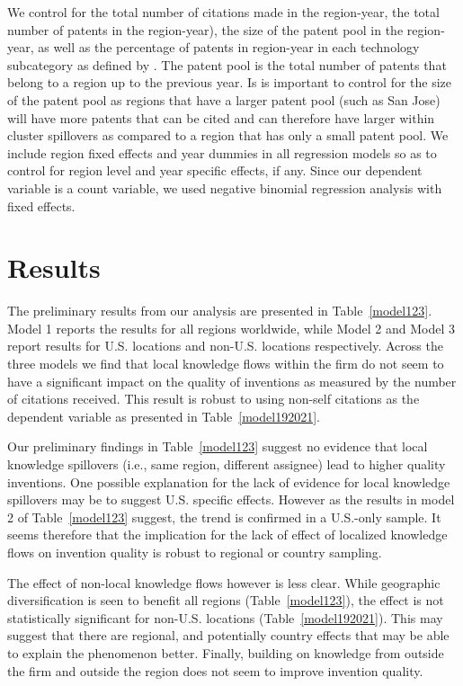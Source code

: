\documentclass[parskip=full,10pt,letterpaper]{article}
\begin{document}
We control for the total number of citations made in the region-year, the total number of patents in the region-year), the size of the patent pool in the region-year, as well as the percentage of patents in region-year in each technology subcategory as defined by \cite{Hall2001}. The patent pool is the total number of patents that belong to a region up to the previous year. Is is important to control for the size of the patent pool as  regions that have a larger patent pool (such as San Jose) will have more patents that can be cited and can therefore have larger within cluster spillovers as compared to a region that has only a small patent pool. We include region fixed effects and year dummies in all regression models so as to control for region level and year specific effects, if any. Since our dependent variable is a count variable, we used negative binomial regression analysis with fixed effects. \par

\section*{Results}
The preliminary results from our analysis are presented in Table~\ref{model123}. Model 1 reports the results for all regions worldwide, while Model 2 and Model 3 report results for U.S. locations and non-U.S. locations respectively. Across the three models we find that local knowledge flows within the firm do not seem to have a significant impact on the quality of inventions as measured by the number of citations received. This result is robust to using non-self citations as the dependent variable as presented in Table~\ref{model192021}. \par
Our preliminary findings in Table~\ref{model123} suggest no evidence that local knowledge spillovers (i.e., same region, different assignee) lead to higher quality inventions.  One possible explanation for the lack of evidence for local knowledge spillovers may be to suggest U.S. specific effects. However as the results in model 2 of Table~\ref{model123} suggest, the trend is confirmed in a U.S.-only sample. It seems therefore that the implication for the lack of effect of localized knowledge flows on invention quality is robust to regional or country sampling. \par
The effect of non-local knowledge flows however is less clear. While geographic diversification is seen to benefit all regions (Table~\ref{model123}), the effect is not statistically significant for non-U.S. locations (Table~\ref{model192021}). This may suggest that there are regional, and potentially country effects that may be able to explain the phenomenon better. Finally, building on knowledge from outside the firm and outside the region does not seem to improve invention quality.\par
\end{document}
